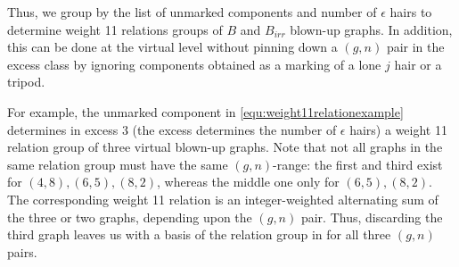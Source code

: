 Thus, we group by the list of unmarked components and number of $\epsilon$ hairs to determine weight 11 relations groups of $B$ and $B_{irr}$ blown-up graphs.
In addition, this can be done at the virtual level without pinning down a $(g,n)$ pair in the excess class by ignoring components obtained as a marking of a lone $j$ hair or a tripod.

For example, the unmarked component in \ref{equ:weight11relationexample} determines in excess 3 (the excess determines the number of $\epsilon$ hairs) a weight 11 relation group of three virtual blown-up graphs. Note that not all graphs in the same relation group must have the same $(g,n)$-range: the first and third exist for $(4,8),(6,5),(8,2)$, whereas the middle one only for $(6,5),(8,2)$.
The corresponding weight 11 relation is an integer-weighted alternating sum of the three or two graphs, depending upon the $(g,n)$ pair. Thus, discarding the third graph leaves us with a basis of the relation group in for all three $(g,n)$ pairs.
